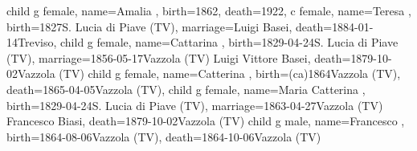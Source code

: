 \documentclass{article}
\begin{document}
\begin{midpage}
\begin{center}
\begin{genealogypicture}
{{{{{                }
                child{
                    g{
                        female,
                        name={Amalia },
                        birth={1862}{},
                        death={1922}{},
                    }
                }
            }
            c{
                female,
                name={Teresa },
                birth={1827}{S. Lucia di Piave (TV)},
                marriage={Luigi Basei}{},
                death={1884-01-14}{Treviso},
            }
            child{
                g{
                    female,
                    name={Cattarina },
                    birth={1829-04-24}{S. Lucia di Piave (TV)},
                    marriage={1856-05-17}{Vazzola (TV) \newline Luigi Vittore Basei},
                    death={1879-10-02}{Vazzola (TV)}
                }
                child{
                    g{
                        female,
                        name={Catterina },
                        birth={(ca)1864}{Vazzola (TV)},
                        death={1865-04-05}{Vazzola (TV)},
                    }
                }
            }
            child{
                g{
                    female,
                    name={Maria Catterina },
                    birth={1829-04-24}{S. Lucia di Piave (TV)},
                    marriage={1863-04-27}{Vazzola (TV) \newline Francesco Biasi},
                    death={1879-10-02}{Vazzola (TV)}
                }
                child{
                    g{
                        male,
                        name={Francesco },
                        birth={1864-08-06}{Vazzola (TV)},
                        death={1864-10-06}{Vazzola (TV)}
                    }
                }
            }
        }
    }
}
\end{genealogypicture}

\end{center}
\end{midpage}
\end{document}
